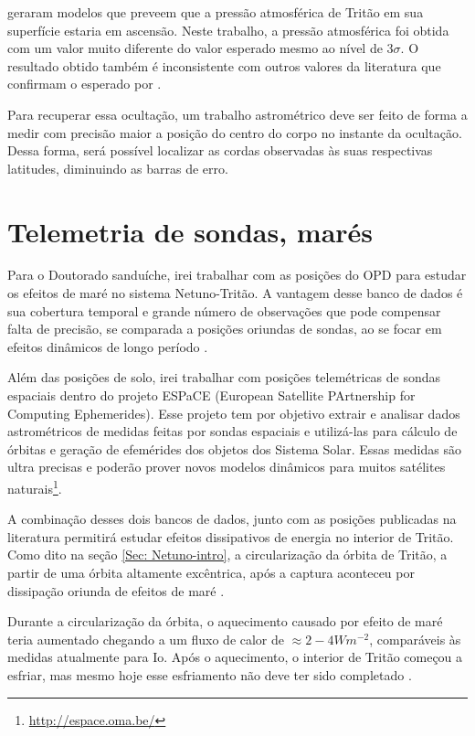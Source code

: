 \documentclass[12pt,a4paper]{monografia}
\begin{document}
\cite{Hansen1992} geraram modelos que preveem que a pressão atmosférica de Tritão em sua superfície estaria em ascensão. Neste trabalho, a pressão atmosférica foi obtida com um valor muito diferente do valor esperado mesmo ao nível de $3\sigma$. O resultado obtido também é inconsistente com outros valores da literatura que confirmam o esperado por \cite{Hansen1992}.

Para recuperar essa ocultação, um trabalho astrométrico deve ser feito de forma a medir com precisão maior a posição do centro do corpo no instante da ocultação. Dessa forma, será possível localizar as cordas observadas às suas respectivas latitudes, diminuindo as barras de erro.


\section{Telemetria de sondas, marés}
\label{Sec: Netuno-mares}

\indent \indent Para o Doutorado sanduíche, irei trabalhar com as posições do OPD para estudar os efeitos de maré no sistema Netuno-Tritão. A vantagem desse banco de dados é sua cobertura temporal e grande número de observações que pode compensar falta de precisão, se comparada a posições oriundas de sondas, ao se focar em efeitos dinâmicos de longo período \citep{Lainey2012}.

Além das posições de solo, irei trabalhar com posições telemétricas de sondas espaciais dentro do projeto ESPaCE (European Satellite PArtnership for Computing Ephemerides). Esse projeto tem por objetivo extrair e analisar dados astrométricos de medidas feitas por sondas espaciais e utilizá-las para cálculo de órbitas e geração de efemérides dos objetos dos Sistema Solar. Essas medidas são ultra precisas e poderão prover novos modelos dinâmicos para muitos satélites naturais\footnote{\url{http://espace.oma.be/}}.

A combinação desses dois bancos de dados, junto com as posições publicadas na literatura permitirá estudar efeitos dissipativos de energia no interior de Tritão. Como dito na seção \ref{Sec: Netuno-intro}, a circularização da órbita de Tritão, a partir de uma órbita altamente excêntrica, após a captura aconteceu por dissipação oriunda de efeitos de maré \citep{Nimmo2015}.

Durante a circularização da órbita, o aquecimento causado por efeito de maré teria aumentado chegando a um fluxo de calor de $\approx 2 - 4 W m^{-2}$, comparáveis às medidas atualmente para Io. Após o aquecimento, o interior de Tritão começou a esfriar, mas mesmo hoje esse esfriamento não deve ter sido completado \citep{McKinnon2007}.
\end{document}
